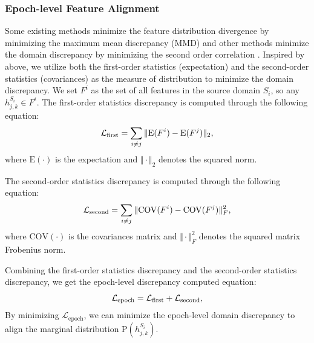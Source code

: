 \documentclass[letterpaper]{article} %
\begin{document}
	\subsubsection{Epoch-level Feature Alignment}
	Some existing methods minimize the feature distribution divergence by minimizing the maximum mean discrepancy (MMD) \citep{tzeng2014deep, wang2018visual, wang2020transfer} and other methods minimize the domain discrepancy by minimizing the second order correlation \citep{sun2016return, sun2016deep}.
	Inspired by above, we utilize both the first-order statistics (expectation) and the second-order statistics (covariances) as the measure of distribution to minimize the domain discrepancy.
	We set $F^i$ as the set of all features in the source domain $S_i$, so any $h^{S_i}_{j, k} \in F^i$.
	The first-order statistics discrepancy is computed through the following equation:
	\begin{equation}
		\label{eq:first}
		\small
		\mathcal{L}_{\mathrm{first}} = \sum_{i \neq j}\Vert \mathrm{E}(F^i) - \mathrm{E}(F^j) \Vert_2,
	\end{equation}
	where $\mathrm{E}(\cdot)$ is the expectation and $\Vert \cdot \Vert_2$ denotes the squared norm.
	
	The second-order statistics discrepancy is computed through the following equation:
	\begin{equation}
		\label{eq:second}
		\small
		\mathcal{L}_{\mathrm{second}} = \sum_{i \neq j}\Vert \mathrm{COV}(F^i) - \mathrm{COV}(F^j) \Vert^2_F,
	\end{equation}
	where $\mathrm{COV}(\cdot)$ is the covariances matrix and $\Vert \cdot \Vert^2_F$ denotes the squared matrix Frobenius norm.
	
	Combining the first-order statistics discrepancy and the second-order statistics discrepancy, we get the epoch-level discrepancy computed equation:
	\begin{equation}
		\label{eq:epoch}
		\small
		\mathcal{L}_{\mathrm{epoch}} = \mathcal{L}_{\mathrm{first}} + \mathcal{L}_{\mathrm{second}},
	\end{equation}
	By minimizing $\mathcal{L}_{\mathrm{epoch}}$, we can minimize the epoch-level domain discrepancy to align the marginal distribution  $\mathrm{P}(h^{S_i}_{j, k})$.
	
\end{document}

